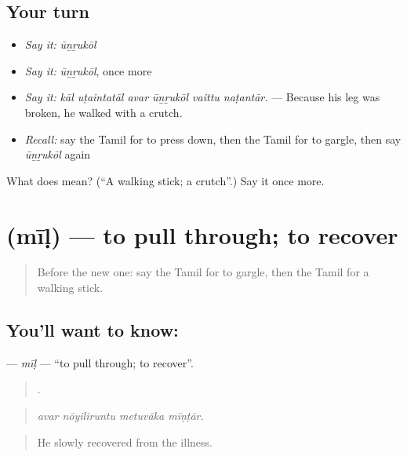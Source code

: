\subsection*{Your turn}
\begin{itemize}
\raggedright
  \item \emph{Say it:} \emph{ūṉṟukōl}
  \item \emph{Say it:} \emph{ūṉṟukōl}, once more
  \item \emph{Say it:} \emph{kāl uṭaintatāl avar ūṉṟukōl vaittu naṭantār.} — Because his leg was broken, he walked with a crutch.
  \item \emph{Recall:} say the Tamil for to press down, then the Tamil for to gargle, then say \emph{ūṉṟukōl} again
\end{itemize}

\begin{tcolorbox}[breakable,colback=teal!4,colframe=teal!35!black,title={Before you move on}]
What does  mean? (\textquotedblleft{}A walking stick; a crutch\textquotedblright{}.) Say it once more.
\end{tcolorbox}
\section[\texorpdfstring{\ta{மீள்} (mīḷ)}{மீள் (mīḷ)}]{ (mīḷ) — to pull through; to recover}

\label{lesson:TA-C486-mil}



\begin{quote}
Before the new one: say the Tamil for to gargle, then the Tamil for a walking stick.
\end{quote}

\subsection*{You'll want to know: }
\textbf{} — \emph{mīḷ} — \textquotedblleft{}to pull through; to recover\textquotedblright{}.

\begin{quote}
   .
\end{quote}

\begin{quote}
\emph{avar nōyiliruntu metuvāka mīṇṭār.}
\end{quote}

\begin{quote}
He slowly recovered from the illness.
\end{quote}

